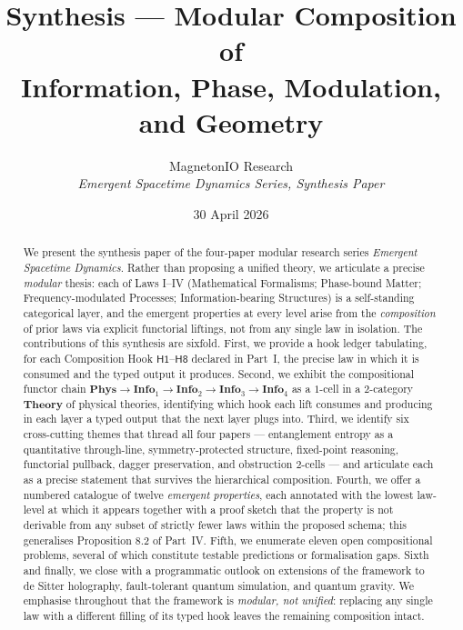 \documentclass[12pt]{article}
\title{Synthesis --- Modular Composition of\\
Information, Phase, Modulation, and Geometry}
\author{MagnetonIO Research \\
\textit{Emergent Spacetime Dynamics Series, Synthesis Paper}}
\date{30 April 2026}
\theoremstyle{definition}
\theoremstyle{remark}
\newcommand{\Phys}{\mathbf{Phys}}
\newcommand{\Info}{\mathbf{Info}}
\newcommand{\Theory}{\mathbf{Theory}}
\begin{document}
\maketitle

\begin{abstract}
We present the synthesis paper of the four-paper modular research series
\emph{Emergent Spacetime Dynamics}. Rather than proposing a unified theory, we
articulate a precise \emph{modular} thesis: each of Laws I--IV (Mathematical
Formalisms; Phase-bound Matter; Frequency-modulated Processes;
Information-bearing Structures) is a self-standing categorical layer, and the
emergent properties at every level arise from the \emph{composition} of prior
laws via explicit functorial liftings, not from any single law in isolation.
The contributions of this synthesis are sixfold. First, we provide a hook
ledger tabulating, for each Composition Hook $\mathsf{H1}$--$\mathsf{H8}$
declared in Part~I, the precise law in which it is consumed and the typed
output it produces. Second, we exhibit the compositional functor chain $\Phys
\to \Info_{1} \to \Info_{2} \to \Info_{3} \to \Info_{4}$ as a $1$-cell in a
$2$-category $\Theory$ of physical theories, identifying which hook each lift
consumes and producing in each layer a typed output that the next layer plugs
into. Third, we identify six cross-cutting themes that thread all four papers
--- entanglement entropy as a quantitative through-line, symmetry-protected
structure, fixed-point reasoning, functorial pullback, dagger preservation,
and obstruction $2$-cells --- and articulate each as a precise statement that
survives the hierarchical composition. Fourth, we offer a numbered catalogue
of twelve \emph{emergent properties}, each annotated with the lowest
law-level at which it appears together with a proof sketch that the property
is not derivable from any subset of strictly fewer laws within the proposed
schema; this generalises Proposition 8.2 of Part~IV. Fifth, we enumerate
eleven open compositional problems, several of which constitute testable
predictions or formalisation gaps. Sixth and finally, we close with a
programmatic outlook on extensions of the framework to de Sitter holography,
fault-tolerant quantum simulation, and quantum gravity. We emphasise
throughout that the framework is \emph{modular, not unified}\/: replacing any
single law with a different filling of its typed hook leaves the remaining
composition intact.
\end{abstract}

\tableofcontents
\end{document}
